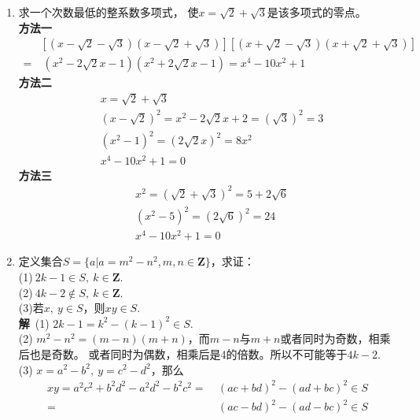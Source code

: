 \begin{enumerate}[label={【\textbf{例\thechapter.\arabic*}】},
 leftmargin=\inteval{\myenumleftmargin}pt,
 itemsep=\inteval{\myenumitempsep}pt,
 itemindent=\inteval{\myenumitemindent}pt]
\item\label{sqrt2+sqrt3极小多项式} 求一个次数最低的整系数多项式，
使$ x=\sqrt{2}+\sqrt{3} $是该多项式的零点。\\
\textbf{方法一}\ 
\begin{align*}
    &\left[(x-\sqrt{2}-\sqrt{3})(x-\sqrt{2}+\sqrt{3})\right]
    \left[(x+\sqrt{2}-\sqrt{3})(x+\sqrt{2}+\sqrt{3})\right] \\
    =&\ (x^2-2\sqrt{2}x-1)(x^2+2\sqrt{2}x-1)=x^4 - 10x^2 + 1 
\end{align*}
\textbf{方法二}\ 
\begin{align}
    & x=\sqrt{2}+\sqrt{3} \nonumber \\
    & (x-\sqrt{2})^2=x^2-2\sqrt{2}x+2=(\sqrt{3})^2=3 \nonumber \\
    & (x^2-1)^2=(2\sqrt{2}x)^2=8x^2 \nonumber \\
    & x^4 - 10x^2 + 1= 0  \label{x4-10x2+1}
\end{align}
\textbf{方法三}\ 
\begin{align*}
    & x^2=(\sqrt{2}+\sqrt{3})^2=5+2\sqrt{6} \\
    & (x^2-5)^2=(2\sqrt{6})^2=24 \\
    & x^4 - 10x^2 + 1= 0
\end{align*}

\item 定义集合$ S=\{a|a=m^2-n^2,m,n\in \textbf{Z}\} $，求证：\\
(1)$ \ 2k-1\in S,\ k\in \textbf{Z} $. \\
(2)$ \ 4k-2\notin S,\ k\in \textbf{Z} $. \\
(3)若$ x,\ y\in S $，则$ xy \in　S $. \\
\textbf{解}\ (1) $ 2k-1=k^2-(k-1)^2 \in S $. \\
(2) $ m^2-n^2=(m-n)(m+n) $，而$ m-n $与$ m+n $或者同时为奇数，相乘后也是奇数。
或者同时为偶数，相乘后是4的倍数。所以不可能等于$ 4k-2 $. \\
(3) $ x=a^2-b^2,\ y=c^2-d^2 $，那么
\begin{align*}
    xy=a^2c^2+b^2d^2-a^2d^2-b^2c^2=&\  (ac+bd)^2-(ad+bc)^2 \in S \\
    =&\  (ac-bd)^2-(ad-bc)^2 \in S
\end{align*}


\end{enumerate}
